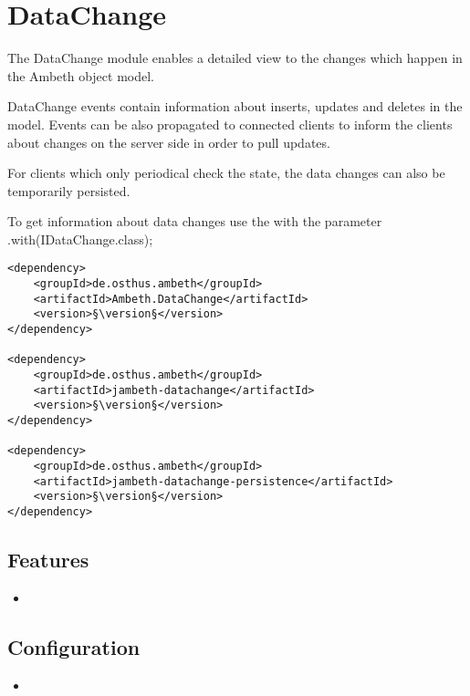 \section{DataChange}
\label{module:DataChange}
\ClearAPI
\TODO
The DataChange module enables a detailed view to the changes which happen in the Ambeth object model. 

DataChange events contain information about inserts, updates and deletes in the model. Events can be also propagated to connected clients to inform the clients about changes on the server side in order to pull updates.

For clients which only periodical check the state, the data changes can also be temporarily persisted.

To get information about data changes use the  with the parameter .with(IDataChange.class);

\begin{lstlisting}[style=POM,caption={Maven modules to use \emph{Ambeth DataChange}}]
<dependency>
	<groupId>de.osthus.ambeth</groupId>
	<artifactId>Ambeth.DataChange</artifactId>
	<version>§\version§</version>
</dependency>

<dependency>
	<groupId>de.osthus.ambeth</groupId>
	<artifactId>jambeth-datachange</artifactId>
	<version>§\version§</version>
</dependency>

<dependency>
	<groupId>de.osthus.ambeth</groupId>
	<artifactId>jambeth-datachange-persistence</artifactId>
	<version>§\version§</version>
</dependency>
\end{lstlisting}
\subsection{Features}
\begin{itemize}
	\item {}
\end{itemize}

\subsection{Configuration}
\begin{itemize}
	\item {}
\end{itemize}
